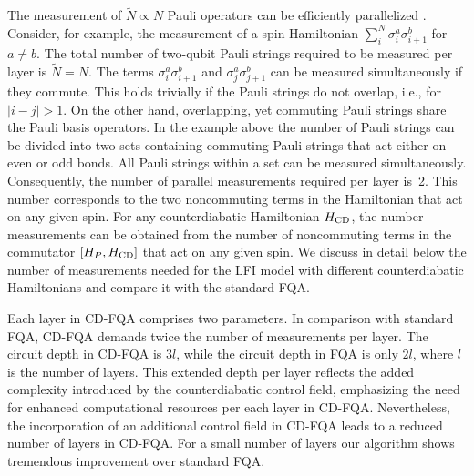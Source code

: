 \documentclass[twocolumn,aps,superscriptaddress,floatfix,longbibliography]{revtex4-2}
\begin{document}
{%
The measurement of {$\tilde{N} \propto N$} %
Pauli operators can be efficiently parallelized
\cite{gokhale2019minimizing,
verteletskyi2020measurement, reggio2023fast, anastasiou2023really,
 zhu2023optimizing}. 
Consider, for example, the measurement of a spin Hamiltonian \(\sum_{i}^{N}
\sigma_{i}^a \sigma_{i+1}^b\) for $a\neq b$. The total number of
two-qubit Pauli strings required to be measured per layer is
{$\tilde{N} = N$}. The terms \(\sigma_{i}^a \sigma_{i+1}^b\) and
\(\sigma_{j}^a \sigma_{j+1}^b\) can be measured simultaneously
if they commute.
This holds trivially if the Pauli strings do not overlap,
i.e., for $|i-j|>1$. On the other hand, overlapping,
yet commuting Pauli strings share the Pauli basis
operators.
In the example above the number of Pauli strings can be
divided into two sets containing commuting Pauli strings 
that act either on even or odd bonds.
%
All Pauli strings within a set can be measured simultaneously.
Consequently, the number of parallel measurements required
per layer is~2. This number corresponds to the two noncommuting
terms in the Hamiltonian that act on any given spin. For any
counterdiabatic Hamiltonian $H_{\rm CD}$, the number
measurements can be obtained from the number of noncommuting 
terms in the commutator $[H_P, H_{\rm CD}]$ that act on any
given spin. %
We discuss %
in detail below
the number of
measurements needed for the LFI model with different
counterdiabatic Hamiltonians and compare it with the standard FQA.} 


 

Each layer in CD-FQA comprises two parameters. In comparison
with standard FQA, %
CD-FQA demands twice
the number of measurements per layer. The circuit depth in
CD-FQA is $3l$, while the circuit depth in FQA is only $2l$,
where $l$ is the number of layers. This extended depth per layer
reflects the added complexity introduced by the counterdiabatic
control field, emphasizing the need for enhanced computational
resources per each layer in CD-FQA. Nevertheless, the
incorporation of an additional control field in CD-FQA leads to
a reduced number of layers in CD-FQA. For a small number of
layers our algorithm shows tremendous improvement over standard
FQA.
\end{document}
